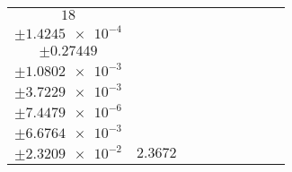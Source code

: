 \documentclass[8pt]{article}
\begin{document}
\begin{longtable}[l]{c c c c c c c c c}
$\num{18}$ & \begin{tabular}[c]{@{}c@{}}$\num{3.0035e-2}$ \\ $\pm\num{1.4245e-4}$\end{tabular} & \begin{tabular}[c]{@{}c@{}}$\num{0.56485}$ \\ $\pm\num{0.27449}$\end{tabular} & \begin{tabular}[c]{@{}c@{}}$\num{11.308}$ \\ $\pm\num{1.0802e-3}$\end{tabular} & \begin{tabular}[c]{@{}c@{}}$\num{1.6207e+3}$ \\ $\pm\num{3.7229e-3}$\end{tabular} & \begin{tabular}[c]{@{}c@{}}$\num{3.2422}$ \\ $\pm\num{7.4479e-6}$\end{tabular} & \begin{tabular}[c]{@{}c@{}}$\num{1.163}$ \\ $\pm\num{6.6764e-3}$\end{tabular} & \begin{tabular}[c]{@{}c@{}}$\num{4.2253}$ \\ $\pm\num{2.3209e-2}$\end{tabular} & $\num{2.3672}$\\
\bottomrule
\end{longtable}
\end{document}
